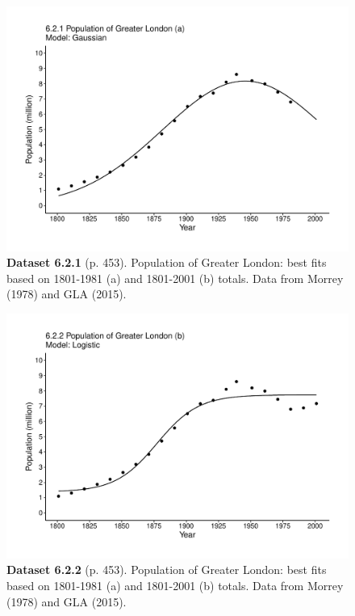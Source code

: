 \documentclass[aps,rmp,preprint,superscriptaddress,10pt,onecolumn]{article}
\begin{document}
\clearpage
\begin{figure}[h]
\includegraphics[width=\textwidth]{output/figs-ggplot/6.2.1.pdf}
\caption*{\textbf{Dataset 6.2.1} (p. 453). Population of Greater London: best fits based on 1801-1981 (a) and 1801-2001 (b) totals. Data from Morrey (1978) and GLA (2015). }
\end{figure}
	
\clearpage
\begin{figure}[h]
\includegraphics[width=\textwidth]{output/figs-ggplot/6.2.2.pdf}
\caption*{\textbf{Dataset 6.2.2} (p. 453). Population of Greater London: best fits based on 1801-1981 (a) and 1801-2001 (b) totals. Data from Morrey (1978) and GLA (2015). }
\end{figure}
	
\end{document}
